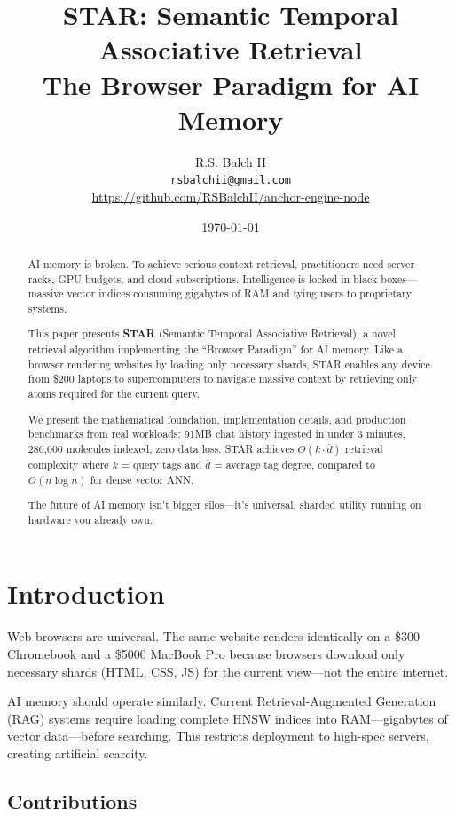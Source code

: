 \documentclass[11pt]{article}
\title{STAR: Semantic Temporal Associative Retrieval\\
\large The Browser Paradigm for AI Memory}
\author{
    R.S. Balch II\\
    \texttt{rsbalchii@gmail.com}\\
    \url{https://github.com/RSBalchII/anchor-engine-node}
}
\date{\today}
\begin{document}
\maketitle

\begin{abstract}
AI memory is broken. To achieve serious context retrieval, practitioners need server racks, GPU budgets, and cloud subscriptions. Intelligence is locked in black boxes---massive vector indices consuming gigabytes of RAM and tying users to proprietary systems.

This paper presents \textbf{STAR} (Semantic Temporal Associative Retrieval), a novel retrieval algorithm implementing the ``Browser Paradigm'' for AI memory. Like a browser rendering websites by loading only necessary shards, STAR enables any device from \$200 laptops to supercomputers to navigate massive context by retrieving only atoms required for the current query.

We present the mathematical foundation, implementation details, and production benchmarks from real workloads: 91MB chat history ingested in under 3 minutes, 280,000 molecules indexed, zero data loss. STAR achieves $O(k \cdot \bar{d})$ retrieval complexity where $k$ = query tags and $\bar{d}$ = average tag degree, compared to $O(n \log n)$ for dense vector ANN.

The future of AI memory isn't bigger silos---it's universal, sharded utility running on hardware you already own.
\end{abstract}

\section{Introduction}
\label{sec:introduction}

Web browsers are universal. The same website renders identically on a \$300 Chromebook and a \$5000 MacBook Pro because browsers download only necessary shards (HTML, CSS, JS) for the current view---not the entire internet.

AI memory should operate similarly. Current Retrieval-Augmented Generation (RAG) systems require loading complete HNSW indices into RAM---gigabytes of vector data---before searching. This restricts deployment to high-spec servers, creating artificial scarcity.

\subsection{Contributions}
\end{document}
